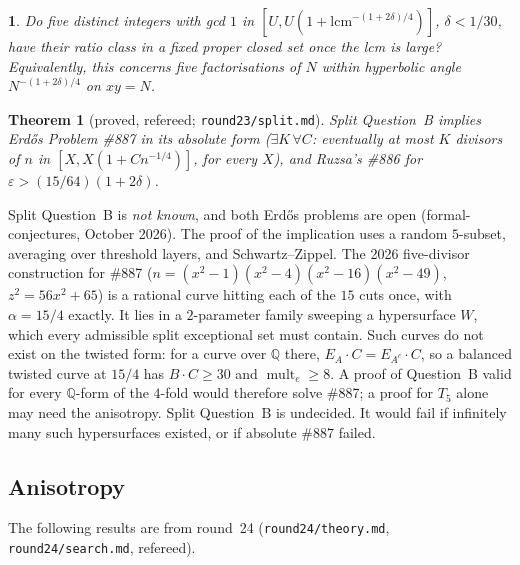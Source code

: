 \documentclass[11pt]{article}
\newtheorem{theorem}{Theorem}[section]
\newcommand{\namedname}{}
\newtheorem*{namedinner}{\namedname}
\newenvironment{named}[1]{\renewcommand{\namedname}{#1}\begin{namedinner}}{\end{namedinner}}
\newcommand{\Q}{\mathbb Q}
\newcommand{\mult}{\operatorname{mult}}
\newcommand{\rec}[1]{\texttt{#1}}
\begin{document}
\begin{named}{Split Question B (not known)}
Do five distinct integers with gcd \(1\) in
\([U,U(1+\mathrm{lcm}^{-(1+2\delta)/4})]\), \(\delta<1/30\), have their ratio
class in a fixed proper closed set once the lcm is large?  Equivalently, this
concerns five factorisations of \(N\) within hyperbolic angle
\(N^{-(1+2\delta)/4}\) on \(xy=N\).
\end{named}

\begin{theorem}[proved, refereed; \rec{round23/split.md}]\label{thm:split}
Split Question~B implies Erd\H{o}s Problem
\#887 in its absolute form (\(\exists K\,\forall C\): eventually at most \(K\)
divisors of \(n\) in \([X,X(1+Cn^{-1/4})]\), for every \(X\)), and Ruzsa's
\#886 for \(\varepsilon>(15/64)(1+2\delta)\).
\end{theorem}

Split Question~B is \emph{not known}, and both Erd\H{o}s problems are open
(formal-conjectures, October 2026).  The proof of the implication uses a
random \(5\)-subset, averaging over threshold layers, and Schwartz--Zippel.
The 2026 five-divisor construction for \#887
(\(n=(x^2-1)(x^2-4)(x^2-16)(x^2-49)\), \(z^2=56x^2+65\)) is a rational curve
hitting each of the \(15\) cuts once, with \(\alpha=15/4\) exactly.  It lies in
a \(2\)-parameter family sweeping a hypersurface \(W\), which every admissible
split exceptional set must contain.  Such curves do not exist on the twisted
form: for a curve over \(\Q\) there, \(E_A\cdot C=E_{A^c}\cdot C\), so a
balanced twisted curve at \(15/4\) has \(B\cdot C\ge30\) and
\(\mult_e\ge8\).  A proof of Question~B valid for every \(\Q\)-form of the
\(4\)-fold would therefore solve \#887; a proof for \(T_5\) alone may need the
anisotropy.  Split Question~B is undecided.  It would fail if infinitely many
such hypersurfaces existed, or if absolute \#887 failed.

\subsection{Anisotropy}

The following results are from round~24 (\rec{round24/theory.md},
\rec{round24/search.md}, refereed).
\end{document}
